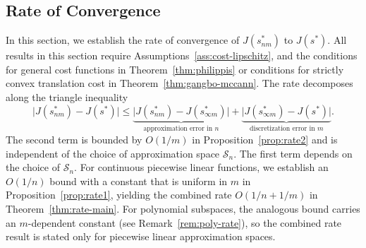 \documentclass[12pt,leqno]{amsart}
\begin{document}
\subsection{Rate of Convergence}\label{subsec:rate}

In this section, we establish the rate of convergence of
$J(s_{nm}^*)$ to $J(s^*)$.  All results in this section require
Assumptions~\ref{ass:cost-lipschitz}, and the conditions for general
cost functions in Theorem~\ref{thm:philippis} or conditions for
strictly convex translation cost in
Theorem~\ref{thm:gangbo-mccann}.  The rate decomposes along the
triangle inequality
\[
\bigl|J(s_{nm}^*)-J(s^*)\bigr|
\leq
\underbrace{\bigl|J(s_{nm}^*)-J(s_{\infty m}^*)\bigr|}_{\text{approximation error in }n}
+
\underbrace{\bigl|J(s_{\infty m}^*)-J(s^*)\bigr|}_{\text{discretization error in }m}.
\]
The second term is bounded by $O(1/m)$ in
Proposition~\ref{prop:rate2} and is independent of the choice of
approximation space $\mathcal{S}_n$.  The first term depends on the choice of $\mathcal{S}_n$.  For
continuous piecewise linear functions, we establish an $O(1/n)$ bound
with a constant that is uniform in $m$ in Proposition~\ref{prop:rate1}, yielding the combined rate
$O(1/n+1/m)$ in Theorem~\ref{thm:rate-main}.  For polynomial
subspaces, the analogous bound carries an $m$-dependent constant
(see Remark~\ref{rem:poly-rate}), so the combined rate result is
stated only for piecewise linear approximation spaces.
\end{document}
